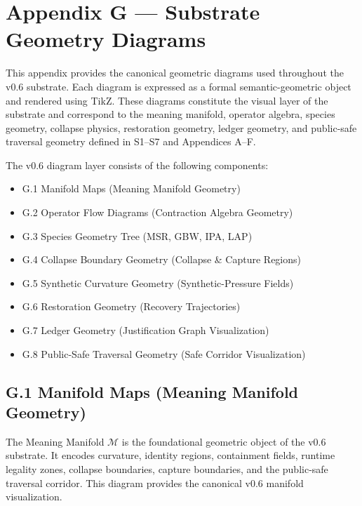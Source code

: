 \section*{Appendix G — Substrate Geometry Diagrams}

\noindent This appendix provides the canonical geometric diagrams used throughout
the v0.6 substrate. Each diagram is expressed as a formal semantic-geometric
object and rendered using TikZ. These diagrams constitute the visual layer of
the substrate and correspond to the meaning manifold, operator algebra, species
geometry, collapse physics, restoration geometry, ledger geometry, and
public-safe traversal geometry defined in S1–S7 and Appendices A–F.

\medskip

\noindent The v0.6 diagram layer consists of the following components:

\begin{itemize}
    \item G.1 Manifold Maps (Meaning Manifold Geometry)
    \item G.2 Operator Flow Diagrams (Contraction Algebra Geometry)
    \item G.3 Species Geometry Tree (MSR, GBW, IPA, LAP)
    \item G.4 Collapse Boundary Geometry (Collapse & Capture Regions)
    \item G.5 Synthetic Curvature Geometry (Synthetic-Pressure Fields)
    \item G.6 Restoration Geometry (Recovery Trajectories)
    \item G.7 Ledger Geometry (Justification Graph Visualization)
    \item G.8 Public-Safe Traversal Geometry (Safe Corridor Visualization)
\end{itemize}


\subsection*{G.1 Manifold Maps (Meaning Manifold Geometry)}

\noindent The Meaning Manifold $\mathcal{M}$ is the foundational geometric object
of the v0.6 substrate. It encodes curvature, identity regions, containment
fields, runtime legality zones, collapse boundaries, capture boundaries, and the
public-safe traversal corridor. This diagram provides the canonical v0.6
manifold visualization.

